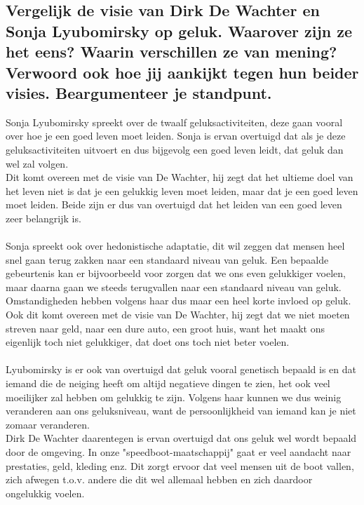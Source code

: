 \documentclass[11pt,a4paper,titlepage]{article}
\begin{document}
\subsection{Vergelijk de visie van Dirk De Wachter en Sonja Lyubomirsky op geluk. Waarover zijn ze het eens? Waarin verschillen ze van mening? Verwoord ook hoe jij aankijkt tegen hun beider visies. Beargumenteer je standpunt. }
Sonja Lyubomirsky spreekt over de twaalf geluksactiviteiten, deze gaan vooral over hoe je een goed leven moet leiden. Sonja is ervan overtuigd dat als je deze geluksactiviteiten uitvoert en dus bijgevolg een goed leven leidt, dat geluk dan wel zal volgen.\\
Dit komt overeen met de visie van De Wachter, hij zegt dat het ultieme doel van het leven niet is dat je een gelukkig leven moet leiden, maar dat je een goed leven moet leiden. Beide zijn er dus van overtuigd dat het leiden van een goed leven zeer belangrijk is. \\ \\
Sonja spreekt ook over hedonistische adaptatie, dit wil zeggen dat mensen heel snel gaan terug zakken naar een standaard niveau van geluk. Een bepaalde gebeurtenis kan er bijvoorbeeld voor zorgen dat we ons even gelukkiger voelen, maar daarna gaan we steeds terugvallen naar een standaard niveau van geluk. Omstandigheden hebben volgens haar dus maar een heel korte invloed op geluk.\\
Ook dit komt overeen met de visie van De Wachter, hij zegt dat we niet moeten streven naar geld, naar een dure auto, een groot huis, want het maakt ons eigenlijk toch niet gelukkiger, dat doet ons toch niet beter voelen. \\ \\
Lyubomirsky is er ook van overtuigd dat geluk vooral genetisch bepaald is en dat iemand die de neiging heeft om altijd negatieve dingen te zien, het ook veel moeilijker zal hebben om gelukkig te zijn. Volgens haar kunnen we dus weinig veranderen aan ons geluksniveau, want de persoonlijkheid van iemand kan je niet zomaar veranderen.\\
Dirk De Wachter daarentegen is ervan overtuigd dat ons geluk wel wordt bepaald door de omgeving. In onze "speedboot-maatschappij"  gaat er veel aandacht naar prestaties, geld, kleding enz. Dit zorgt ervoor dat veel mensen uit de boot vallen, zich afwegen t.o.v. andere die dit wel allemaal hebben en zich daardoor ongelukkig voelen.
\end{document}
